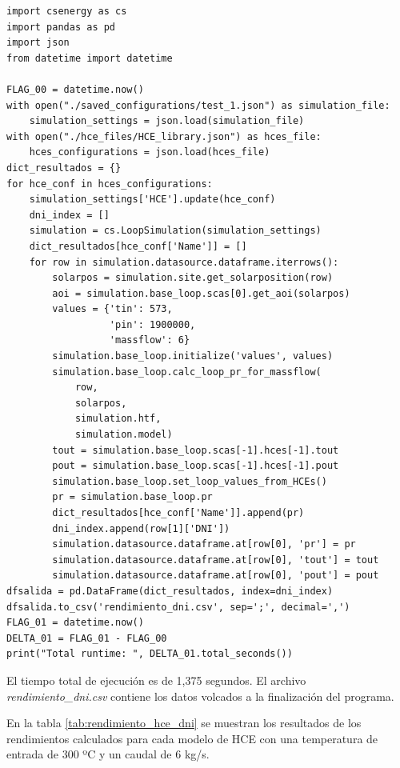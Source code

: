 \begin{lstlisting}[caption=Programa para el análisis del rendimiento en función de DNI, label={lst:script_test1}]
import csenergy as cs
import pandas as pd
import json
from datetime import datetime

FLAG_00 = datetime.now()
with open("./saved_configurations/test_1.json") as simulation_file:
    simulation_settings = json.load(simulation_file)
with open("./hce_files/HCE_library.json") as hces_file:
    hces_configurations = json.load(hces_file)
dict_resultados = {}
for hce_conf in hces_configurations:
    simulation_settings['HCE'].update(hce_conf)
    dni_index = []
    simulation = cs.LoopSimulation(simulation_settings)
    dict_resultados[hce_conf['Name']] = []
    for row in simulation.datasource.dataframe.iterrows():
        solarpos = simulation.site.get_solarposition(row)
        aoi = simulation.base_loop.scas[0].get_aoi(solarpos)
        values = {'tin': 573,
                  'pin': 1900000,
                  'massflow': 6}
        simulation.base_loop.initialize('values', values)
        simulation.base_loop.calc_loop_pr_for_massflow(
            row,
            solarpos,
            simulation.htf,
            simulation.model)
        tout = simulation.base_loop.scas[-1].hces[-1].tout
        pout = simulation.base_loop.scas[-1].hces[-1].pout
        simulation.base_loop.set_loop_values_from_HCEs()
        pr = simulation.base_loop.pr
        dict_resultados[hce_conf['Name']].append(pr)
        dni_index.append(row[1]['DNI'])
        simulation.datasource.dataframe.at[row[0], 'pr'] = pr
        simulation.datasource.dataframe.at[row[0], 'tout'] = tout
        simulation.datasource.dataframe.at[row[0], 'pout'] = pout
dfsalida = pd.DataFrame(dict_resultados, index=dni_index)
dfsalida.to_csv('rendimiento_dni.csv', sep=';', decimal=',')
FLAG_01 = datetime.now()
DELTA_01 = FLAG_01 - FLAG_00
print("Total runtime: ", DELTA_01.total_seconds())
\end{lstlisting}

El tiempo total de ejecución es de 1,375 segundos. El archivo \emph{rendimiento\_dni.csv} contiene los datos volcados a la finalización del programa.

En la tabla \ref{tab:rendimiento_hce_dni} se muestran los resultados de los rendimientos calculados para cada modelo de HCE con una temperatura de entrada de 300 ºC y un caudal de 6 kg/s.

